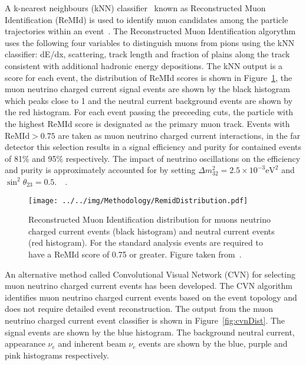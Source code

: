 A k-nearest neighbours (kNN) classifier~\cite{altman1992introduction}
known as Reconstructed Muon Identification (ReMId)
is used to identify muon candidates among the particle
trajectories within an event~\cite{raddatzThesis}. 
The Reconstructed Muon Identification algorythm uses the following
four variables to distinguish muons from pions using the kNN
classifier:  
dE/dx, scattering, track length and fraction of plains along the track
consistent with additional hadronic energy
depositions. The kNN output is a score for each event, the
distribution of ReMId scores is shown in Figure~\ref{fig:remidDist},
the muon neutrino charged current signal events are shown by the black
histogram which peaks close to 1 and the neutral current background
events are shown by the red histogram. 
For each event passing the preceeding cuts, the particle with the
highest ReMId score is designated as the primary muon track.
Events with $\text{ReMId} > 0.75$ are taken as muon neutrino
charged current interactions, in the far detector this selection
results in a signal efficiency and purity for contained events of 81\%
and 95\% respectively. 
The impact of neutrino oscillations on the efficiency
and purity is approximately accounted for by setting $\Delta m^2_{32}
= 2.5 \times 10^{-3} \text{eV}^2$ and $\sin^2\theta_{23} =
0.5$.~\cite{raddatzThesis}~\cite{remidNote}.   



\begin{figure}
  \centering
  \texttt{[image: ../../img/Methodology/RemidDistribution.pdf]}
  \caption{
    Reconstructed Muon Identification distribution for muons neutrino
    charged current events (black histogram) and neutral current
    events (red histogram). For the standard analysis events are
    required to have a ReMId score of 0.75 or greater. Figure taken
    from~\cite{remidNote}.  
  } 
  \label{fig:remidDist}
\end{figure}


An alternative method called Convolutional Visual Network (CVN) for
selecting muon neutrino charged current events has been developed.
The CVN algorithm identifies muon neutrino charged current
events based on the event topology and does not require detailed event
reconstruction. 
The output from the muon neutrino charged current event classifier is
shown in Figure~\ref{fig:cvnDist}. The signal events are shown by the
blue histogram. The background neutral current, appearance $\nu_e$ and
inherent beam $\nu_e$ events are shown by the blue, purple and pink
histograms respectively.
~\cite{aurisano2016convolutional}

